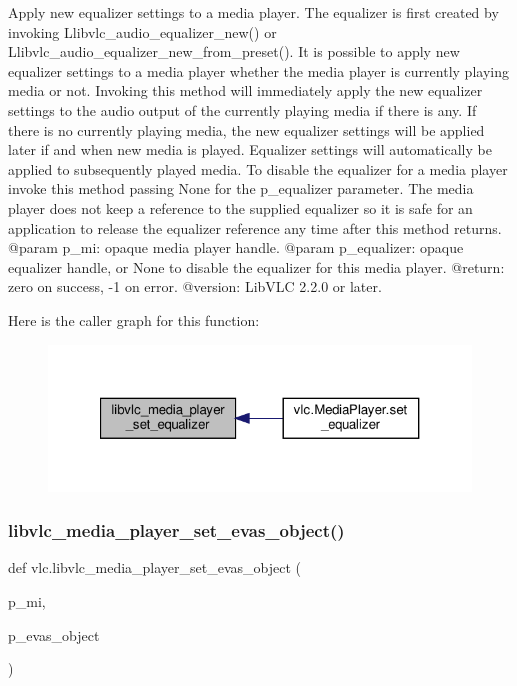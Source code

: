 \begin{DoxyVerb}Apply new equalizer settings to a media player.
The equalizer is first created by invoking L{libvlc_audio_equalizer_new}() or
L{libvlc_audio_equalizer_new_from_preset}().
It is possible to apply new equalizer settings to a media player whether the media
player is currently playing media or not.
Invoking this method will immediately apply the new equalizer settings to the audio
output of the currently playing media if there is any.
If there is no currently playing media, the new equalizer settings will be applied
later if and when new media is played.
Equalizer settings will automatically be applied to subsequently played media.
To disable the equalizer for a media player invoke this method passing None for the
p_equalizer parameter.
The media player does not keep a reference to the supplied equalizer so it is safe
for an application to release the equalizer reference any time after this method
returns.
@param p_mi: opaque media player handle.
@param p_equalizer: opaque equalizer handle, or None to disable the equalizer for this media player.
@return: zero on success, -1 on error.
@version: LibVLC 2.2.0 or later.
\end{DoxyVerb}
 Here is the caller graph for this function\+:
\nopagebreak
\begin{figure}[H]
\begin{center}
\leavevmode
\includegraphics[width=321pt]{namespacevlc_a236caf234257aa13be369f848074238f_icgraph}
\end{center}
\end{figure}
\mbox{\label{namespacevlc_a1ba42eb92d2829216be25aa31ec8982d}} 
\subsubsection{\texorpdfstring{libvlc\+\_\+media\+\_\+player\+\_\+set\+\_\+evas\+\_\+object()}{libvlc\_media\_player\_set\_evas\_object()}}
{\footnotesize\ttfamily def vlc.\+libvlc\+\_\+media\+\_\+player\+\_\+set\+\_\+evas\+\_\+object (\begin{DoxyParamCaption}\item[{}]{p\+\_\+mi,  }\item[{}]{p\+\_\+evas\+\_\+object }\end{DoxyParamCaption})}

